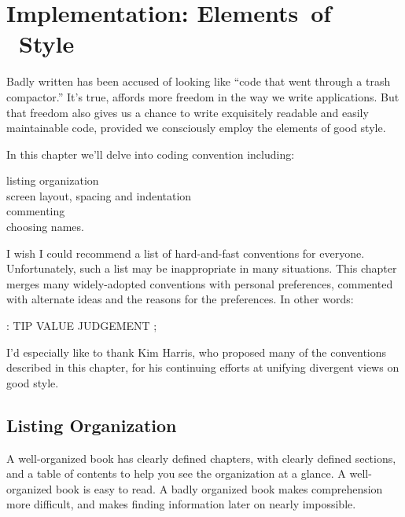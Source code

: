 
\chapter{Implementation:
%
Elements~of \Forth{}~Style}

Badly written \Forth{} has been accused of looking like ``code that
went through a trash compactor.'' It's true, \Forth{} affords more
freedom in the way we write applications.  But that freedom also gives
us a chance to write exquisitely readable and easily maintainable
code, provided we consciously employ the elements of good \Forth{}
style.

In this chapter we'll delve into \Forth{} coding convention
including:

\begin{tfquot}
listing organization \\
screen layout, spacing and indentation \\
commenting \\
choosing names.
\end{tfquot}
I wish I could recommend a list of hard-and-fast conventions for
everyone.  Unfortunately, such a list may be inappropriate in many
situations.  This chapter merges many widely-adopted conventions with
personal preferences, commented with alternate ideas and the reasons
for the preferences.  In other words:
\begin{Code}
: TIP  VALUE JUDGEMENT ;
\end{Code}
I'd especially like to thank Kim Harris, who
proposed many of the conventions described in this chapter, for his
continuing efforts at unifying divergent views on good \Forth{} style.

\section{Listing Organization}

A well-organized book has clearly defined chapters, with clearly defined
sections, and a table of contents to help you see the organization at a
glance.  A well-organized book is easy to read.  A badly organized book
makes comprehension more difficult, and makes finding information
later on nearly impossible.

